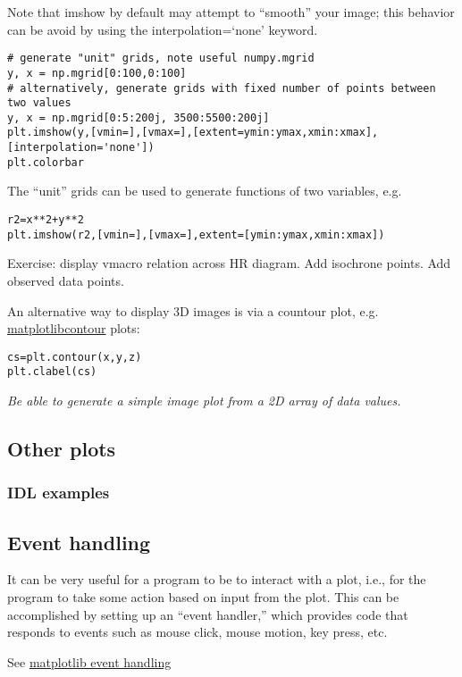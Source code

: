 \documentclass{article}
\newcommand{\test}[1]{%
    \begin{center}
        \colorbox{hl}{\parbox{0.9\textwidth}{\emph{#1}}}
    \end{center}}
\begin{document}
Note that imshow by default may attempt to ``smooth'' your image; this
behavior can be avoid by using the interpolation=`none' keyword.
\begin{verbatim}
# generate "unit" grids, note useful numpy.mgrid
y, x = np.mgrid[0:100,0:100]
# alternatively, generate grids with fixed number of points between two values
y, x = np.mgrid[0:5:200j, 3500:5500:200j]
plt.imshow(y,[vmin=],[vmax=],[extent=ymin:ymax,xmin:xmax],[interpolation='none'])
plt.colorbar
\end{verbatim}
The ``unit'' grids can be used to generate functions of two variables,
e.g.
\begin{verbatim}
r2=x**2+y**2
plt.imshow(r2,[vmin=],[vmax=],extent=[ymin:ymax,xmin:xmax])
\end{verbatim}
Exercise: display vmacro relation across HR diagram. Add isochrone
points. Add observed data points.

An alternative way to display 3D images is via a countour plot, e.g.
\href{http://matplotlib.org/examples/pylab_examples/contour_demo.html}
{matplotlibcontour} plots:
\begin{verbatim}
cs=plt.contour(x,y,z)
plt.clabel(cs)
\end{verbatim}

\test{Be able to generate a simple image plot from a 2D array of data
values.}

\subsection{Other plots}
\subsubsection{IDL examples}
\subsection{Event handling}
It can be very useful for a program to be to interact with a plot,
i.e., for the program to take some action based on input from the
plot. This can be accomplished by setting up an ``event handler,''
which provides code that responds to events such as mouse click, mouse
motion, key press, etc.

See \href{http://matplotlib.org/users/event_handling.html}
{matplotlib event handling}
\end{document}
